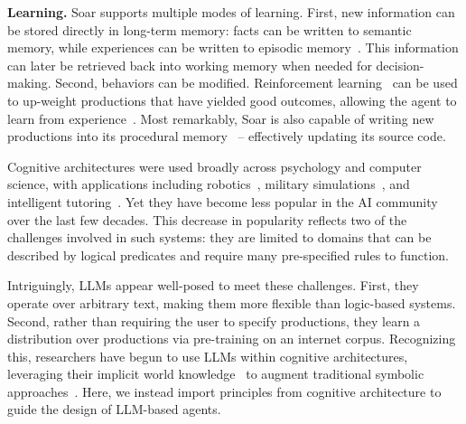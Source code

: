 \documentclass[10pt]{article} %
\begin{document}
\textbf{Learning.} Soar supports multiple modes of learning. First, new information can be stored directly in long-term memory: facts can be written to semantic memory, while experiences can be written to episodic memory~\citep{derbinsky2012multi}. This information can later be retrieved back into working memory when needed for decision-making. Second, behaviors can be modified. Reinforcement learning~\citep{sutton2018reinforcement} can be used to up-weight productions that have yielded good outcomes, allowing the agent to learn from experience~\citep{nason2005soar}. Most remarkably, Soar is also capable of writing new productions into its procedural memory~\citep{laird1986chunking} -- effectively updating its source code.

Cognitive architectures were used broadly across psychology and computer science, with applications including robotics~\citep{laird2012cognitive}, military simulations~\citep{jones1999automated, tambe1995intelligent}, and intelligent tutoring~\citep{koedinger1997intelligent}. 
Yet they have become less popular in the AI community over the last few decades. This decrease in popularity reflects two of the challenges involved in such systems: they are limited to domains that can be described by logical predicates and require many pre-specified rules to function. 

Intriguingly, LLMs appear well-posed to meet these challenges. First, they operate over arbitrary text, making them more flexible than logic-based systems. Second, rather than requiring the user to specify productions, they learn a distribution over productions via pre-training on an internet corpus. Recognizing this, researchers have begun to use LLMs within cognitive architectures, leveraging their implicit world knowledge~\citep{wray2021language} to augment traditional symbolic approaches~\citep{kirk2023improving, romero2023synergistic}.
Here, we instead import principles from cognitive architecture to guide the design of LLM-based agents.
\end{document}
